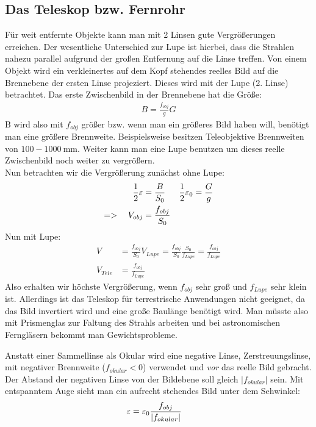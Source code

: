 \subsection{Das Teleskop bzw. Fernrohr}
Für weit entfernte Objekte kann man mit 2 Linsen gute Vergrößerungen erreichen. Der wesentliche Unterschied zur Lupe ist hierbei, dass die Strahlen nahezu parallel aufgrund der großen Entfernung auf die Linse treffen.
Von einem Objekt wird ein verkleinertes auf dem Kopf stehendes reelles Bild auf die Brennebene der ersten Linse projeziert. Dieses wird mit der Lupe (2. Linse) betrachtet.
Das erste Zwischenbild in der Brennebene hat die Größe:
\begin{align*}
	B=\frac{f_{obj}}{g}G
\end{align*}
B wird also mit $f_{obj}$ größer bzw. wenn man ein größeres Bild haben will, benötigt man eine größere Brennweite. Beispielsweise besitzen Teleobjektive Brennweiten von $\num{100}-\SI{1000}{\milli\meter}$.
Weiter kann man eine Lupe benutzen um dieses reelle Zwischenbild noch weiter zu vergrößern.\\
Nun betrachten wir die Vergrößerung zunächst ohne Lupe:
\begin{align*}
	\frac{1}{2}\varepsilon&=\frac{B}{S_0}&\frac{1}{2}\varepsilon_0&=\frac{G}{g}\\
	=>\quad V_{obj}&=\frac{f_{obj}}{S_0}
\end{align*}
Nun mit Lupe:
\begin{align*}
	V&=\frac{f_{obj}}{S_0}V_{Lupe}=\frac{f_{obj}}{S_0}\frac{S_0}{f_{Lupe}}=\frac{f_{obj}}{f_{Lupe}}\\
	V_{Tele}&=\frac{f_{obj}}{f_{Lupe}}
\end{align*}
Also erhalten wir höchste Vergrößerung, wenn $f_{obj}$ sehr groß und $f_{Lupe}$ sehr klein ist. Allerdings ist das Teleskop für terrestrische Anwendungen nicht geeignet, da das Bild invertiert wird und eine große Baulänge benötigt wird. Man müsste also mit Prismenglas zur Faltung des Strahls arbeiten und bei astronomischen Ferngläsern bekommt man Gewichtsprobleme.

Anstatt einer Sammellinse als Okular wird eine negative Linse, Zerstreuungslinse, mit negativer Brennweite ($f_{okular}<0$) verwendet und \emph{vor} das reelle Bild gebracht. Der Abstand der negativen Linse von der Bildebene soll gleich $\vert f_{okular}\vert$ sein.
Mit entspanntem Auge sieht man ein aufrecht stehendes Bild unter dem Sehwinkel:
\begin{align*}
	\varepsilon&=\varepsilon_0\frac{f_{obj}}{\vert f_{okular}\vert}
\end{align*}

